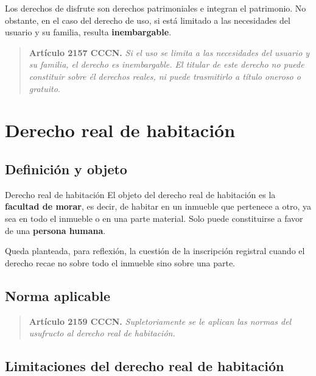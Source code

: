 \documentclass[12pt,oneside]{book}
\begin{document}
Los derechos de disfrute son derechos patrimoniales e integran el patrimonio. No obstante, en el caso del derecho de uso, si está limitado a las necesidades del usuario y su familia, resulta \textbf{inembargable}.

\begin{quote}
\textbf{Artículo 2157 CCCN.} \textit{Si el uso se limita a las necesidades del usuario y su familia, el derecho es inembargable. El titular de este derecho no puede constituir sobre él derechos reales, ni puede trasmitirlo a título oneroso o gratuito.}
\end{quote}

\section{Derecho real de habitación}

\subsection{Definición y objeto}

\begin{definition}{Derecho real de habitación}
El objeto del derecho real de habitación es la \textbf{facultad de morar}, es decir, de habitar en un inmueble que pertenece a otro, ya sea en todo el inmueble o en una parte material. Solo puede constituirse a favor de una \textbf{persona humana}.
\end{definition}

\begin{note}
Queda planteada, para reflexión, la cuestión de la inscripción registral cuando el derecho recae no sobre todo el inmueble sino sobre una parte. %
\end{note}

\subsection{Norma aplicable}

\begin{quote}
\textbf{Artículo 2159 CCCN.} \textit{Supletoriamente se le aplican las normas del usufructo al derecho real de habitación.}
\end{quote}

\subsection{Limitaciones del derecho real de habitación}
\end{document}
